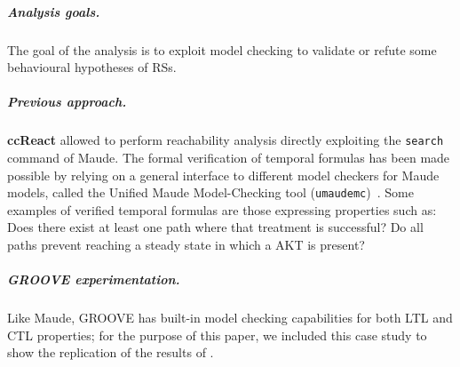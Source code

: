 \subparagraph*{Analysis goals.}
The goal of the analysis is to exploit model checking to validate or refute some behavioural hypotheses of RSs.

\subparagraph*{Previous approach.}
\textbf{ccReact} allowed to perform reachability analysis directly exploiting the \texttt{search} command of Maude. 
The formal verification of temporal formulas has been made possible by relying on a general interface to different model checkers for Maude models, called the Unified Maude Model-Checking tool (\texttt{umaudemc})~\cite{DBLP:journals/jlap/RubioMPV21}.
Some examples of verified temporal formulas are those expressing properties such as:
Does there exist at least one path where that treatment is successful?
Do all paths prevent reaching a steady state in which a AKT is present?

\subparagraph*{GROOVE experimentation.}

Like Maude, GROOVE has built-in model checking capabilities for both LTL and CTL properties; for the purpose of this paper, we included this case study to show the replication of the results of \cite{DBLP:conf/cmsb/BallisBFO24}.


